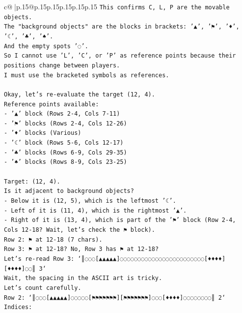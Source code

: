 \documentclass{article}
\begin{document}
{\begin{supertabular}{c@{$\;$}|p{.15\linewidth}@{}p{.15\linewidth}p{.15\linewidth}p{.15\linewidth}p{.15\linewidth}p{.15\linewidth}}
{{{\texttt{This confirms C, L, P are the movable objects.} \\
\texttt{The "background objects" are the blocks in brackets: '▲', '⚑', '♦', '☾', '♣', '♠'.} \\
\texttt{And the empty spots '◌'.} \\
\texttt{So I cannot use 'L', 'C', or 'P' as reference points because their positions change between players.} \\
\texttt{I must use the bracketed symbols as references.} \\
\\ 
\texttt{Okay, let's re{-}evaluate the target (12, 4).} \\
\texttt{Reference points available:} \\
\texttt{{-} '▲' block (Rows 2{-}4, Cols 7{-}11)} \\
\texttt{{-} '⚑' blocks (Rows 2{-}4, Cols 12{-}26)} \\
\texttt{{-} '♦' blocks (Various)} \\
\texttt{{-} '☾' block (Rows 5{-}6, Cols 12{-}17)} \\
\texttt{{-} '♣' blocks (Rows 6{-}9, Cols 29{-}35)} \\
\texttt{{-} '♠' blocks (Rows 8{-}9, Cols 23{-}25)} \\
\\ 
\texttt{Target: (12, 4).} \\
\texttt{Is it adjacent to background objects?} \\
\texttt{{-} Below it is (12, 5), which is the leftmost '☾'.} \\
\texttt{{-} Left of it is (11, 4), which is the rightmost '▲'.} \\
\texttt{{-} Right of it is (13, 4), which is part of the '⚑' block (Row 2{-}4, Cols 12{-}18? Wait, let's check the ⚑ block).} \\
\texttt{Row 2: ⚑ at 12{-}18 (7 chars).} \\
\texttt{Row 3: ⚑ at 12{-}18? No, Row 3 has ⚑ at 12{-}18?} \\
\texttt{Let's re{-}read Row 3: `║◌◌◌{[}▲▲▲▲▲{]}◌◌◌◌◌◌◌◌◌◌◌◌◌◌◌◌◌◌◌◌◌◌◌◌{[}♦♦♦♦{]}{[}♦♦♦♦{]}◌◌║ 3`} \\
\texttt{Wait, the spacing in the ASCII art is tricky.} \\
\texttt{Let's count carefully.} \\
\texttt{Row 2: `║◌◌◌{[}▲▲▲▲▲{]}◌◌◌◌◌{[}⚑⚑⚑⚑⚑⚑⚑{]}{[}⚑⚑⚑⚑⚑⚑⚑{]}◌◌◌{[}♦♦♦♦{]}◌◌◌◌◌◌◌◌║ 2`} \\
\texttt{Indices:} \\
}}}
\end{supertabular}}
\end{document}
